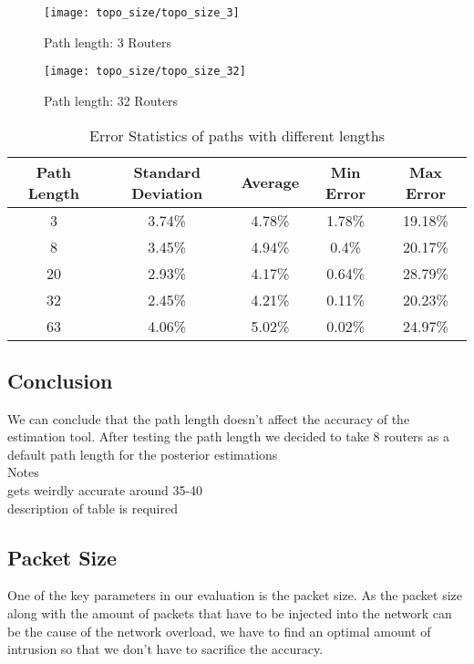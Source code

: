 \begin{figure}[H]%
  \centering
  \begin{minipage}[b]{0.45\textwidth}
    \texttt{[image: topo\_size/topo\_size\_3]}
    \caption{Path length: 3 Routers}
  \end{minipage}
  \hfill
  \begin{minipage}[b]{0.45\textwidth}
    \texttt{[image: topo\_size/topo\_size\_32]}
    \caption{Path length: 32 Routers}
  \end{minipage}
\end{figure}


\begin{table}[h!]
\centering
 \begin{tabular}{||c ||c c c c||} 
 \hline
 Path Length & Standard Deviation & Average & Min Error & Max Error \\ [0.5ex] 
 \hline\hline
 3 & 3.74\% & 4.78\% & 1.78\% & 19.18\% \\ 
 8 & 3.45\% & 4.94\% & 0.4\% & 20.17\% \\
 20 & 2.93\% & 4.17\% & 0.64\% & 28.79\% \\
 32 & 2.45\% & 4.21\% & 0.11\% & 20.23\% \\
 63 & 4.06\% & 5.02\% & 0.02\% & 24.97\% \\ [1ex] 
 \hline
 \end{tabular}
 \caption{Error Statistics of paths with different lengths}

\end{table}


\subsection*{Conclusion}
We can conclude that the path length doesn't affect the accuracy of the estimation tool. After testing the path length we decided to take 8 routers as a default path length for the posterior estimations
\\
Notes\\
gets weirdly accurate around 35-40\\
description of table is required\\

\subsection{Packet Size}
One of the key parameters in our evaluation is the packet size. 
As the packet size along with the amount of packets that have to be injected into the network can be the cause of the network overload, we have to find an optimal amount of intrusion so that we don't have to sacrifice the accuracy. 

